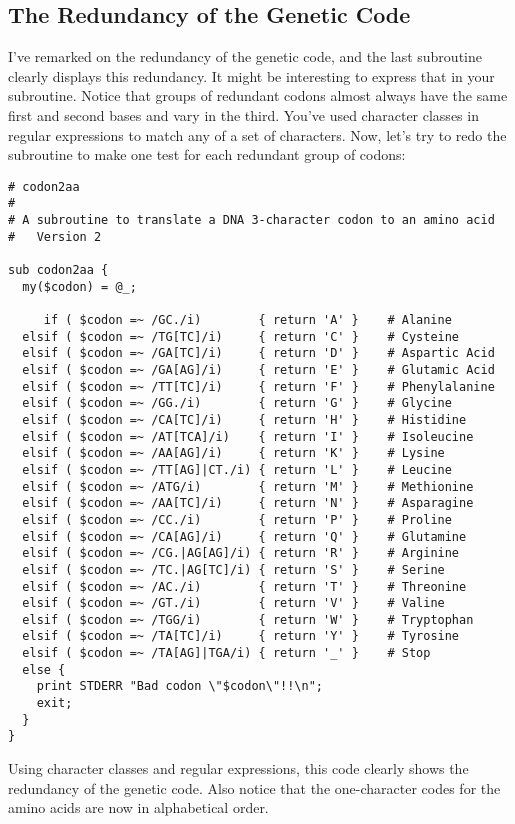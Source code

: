\subsection{The Redundancy of the Genetic Code}
I've remarked on the redundancy of the genetic code, and the last subroutine clearly displays this redundancy. It might be interesting to express that in your subroutine. Notice that groups of redundant codons almost always have the same first and second bases and vary in the third. You've used character classes in regular expressions to match any of a set of characters. Now, let's try to redo the subroutine to make one test for each redundant group of codons: 

\begin{lstlisting}
# codon2aa
#
# A subroutine to translate a DNA 3-character codon to an amino acid
#   Version 2

sub codon2aa {
  my($codon) = @_;
 
     if ( $codon =~ /GC./i)        { return 'A' }    # Alanine
  elsif ( $codon =~ /TG[TC]/i)     { return 'C' }    # Cysteine
  elsif ( $codon =~ /GA[TC]/i)     { return 'D' }    # Aspartic Acid
  elsif ( $codon =~ /GA[AG]/i)     { return 'E' }    # Glutamic Acid
  elsif ( $codon =~ /TT[TC]/i)     { return 'F' }    # Phenylalanine
  elsif ( $codon =~ /GG./i)        { return 'G' }    # Glycine
  elsif ( $codon =~ /CA[TC]/i)     { return 'H' }    # Histidine
  elsif ( $codon =~ /AT[TCA]/i)    { return 'I' }    # Isoleucine
  elsif ( $codon =~ /AA[AG]/i)     { return 'K' }    # Lysine
  elsif ( $codon =~ /TT[AG]|CT./i) { return 'L' }    # Leucine
  elsif ( $codon =~ /ATG/i)        { return 'M' }    # Methionine
  elsif ( $codon =~ /AA[TC]/i)     { return 'N' }    # Asparagine
  elsif ( $codon =~ /CC./i)        { return 'P' }    # Proline
  elsif ( $codon =~ /CA[AG]/i)     { return 'Q' }    # Glutamine
  elsif ( $codon =~ /CG.|AG[AG]/i) { return 'R' }    # Arginine
  elsif ( $codon =~ /TC.|AG[TC]/i) { return 'S' }    # Serine
  elsif ( $codon =~ /AC./i)        { return 'T' }    # Threonine
  elsif ( $codon =~ /GT./i)        { return 'V' }    # Valine
  elsif ( $codon =~ /TGG/i)        { return 'W' }    # Tryptophan
  elsif ( $codon =~ /TA[TC]/i)     { return 'Y' }    # Tyrosine
  elsif ( $codon =~ /TA[AG]|TGA/i) { return '_' }    # Stop
  else {
    print STDERR "Bad codon \"$codon\"!!\n";
    exit;
  }
}
\end{lstlisting}

Using character classes and regular expressions, this code clearly shows the redundancy of the genetic code. Also notice that the one-character codes for the amino acids are now in alphabetical order. 

